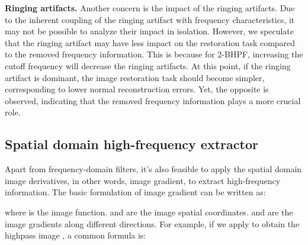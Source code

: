 \documentclass[5p, twocolumn]{elsarticle}[draft]
\begin{document}
\begin{table}[h]
\caption{Quantitative comparison of the anomaly detection performance with different cutoff frequencies. I-AUROC and P-AUROC refer to image-level and pixel-level AUROC respectively. The normal reconstruction errors (Normal errors) are evaluated with MSE in units of 1e-4.}
\end{table}

\textbf{Ringing artifacts.} Another concern is the impact of the ringing artifacts. Due to the inherent coupling of the ringing artifact with frequency characteristics, it may not be possible to analyze their impact in isolation. However, we speculate that the ringing artifact may have less impact on the restoration task compared to the removed frequency information. This is because for 2-BHPF, increasing the cutoff frequency will decrease the ringing artifacts. At this point, if the ringing artifact is dominant, the image restoration task should become simpler, corresponding to lower normal reconstruction errors. Yet, the opposite is observed, indicating that the removed frequency information plays a more crucial role. 

\subsection{Spatial domain high-frequency extractor}
\label{sec5.4}
Apart from frequency-domain filters, it's also feasible to apply the spatial domain image derivatives, in other words, image gradient, to extract high-frequency information. The basic formulation of image gradient can be written as:

where  is the image function.  and  are the image spatial coordinates.  and  are the image gradients along different directions. For example, if we apply  to obtain the highpass image , a common formula is:
\end{document}
